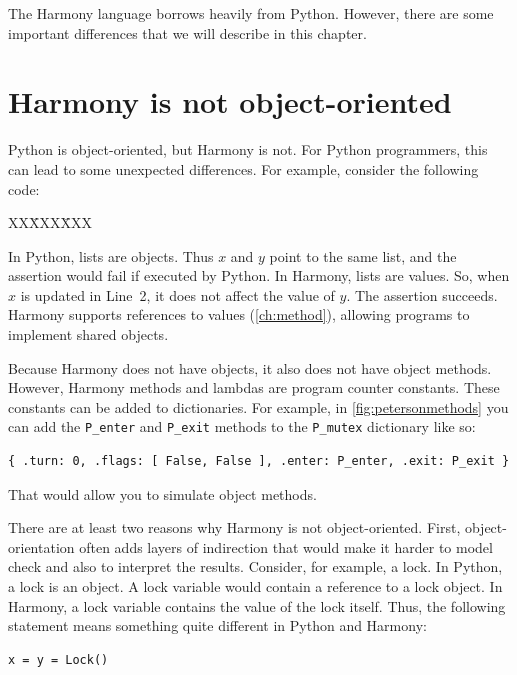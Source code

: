 \documentclass{report}
\newcommand{\harmonysource}[1]{
\begin{tabbing}
XX\=XXX\=XXX\kill
    
\end{tabbing}
}
\newenvironment{code}{
\tcolorbox
}{
\endtcolorbox
}
\begin{document}
The Harmony language borrows heavily from Python.  However, there are
some important differences that we will describe in this chapter.

\section{Harmony is not object-oriented}

Python is object-oriented, but Harmony is not.  For Python programmers,
this can lead to some unexpected differences.
For example, consider the following code:

\begin{code}
\harmonysource{oo}
\end{code}

In Python, lists are objects.  Thus $x$ and $y$ point to the same list,
and the assertion would fail if executed by Python.
In Harmony, lists are values.  So, when $x$ is updated in Line~2, it does
not affect the value of $y$.  The assertion succeeds.
Harmony supports references to values (\autoref{ch:method}),
allowing programs to implement shared objects.

Because Harmony does not have objects, it also does not have object methods.
However, Harmony methods and lambdas are program counter constants.
These constants can be added to dictionaries.
For example, in \autoref{fig:petersonmethods}
you can add the \texttt{P\_enter} and
\texttt{P\_exit} methods to the \texttt{P\_mutex} dictionary
like so:
\begin{code}
\begin{verbatim}
{ .turn: 0, .flags: [ False, False ], .enter: P_enter, .exit: P_exit }
\end{verbatim}
\end{code}
That would allow you to simulate object methods.

There are at least two reasons why Harmony is not object-oriented.
First,
object-orientation often adds layers of indirection that would make it
harder to model check and also to interpret the results.  Consider, for example,
a lock.  In Python, a lock is an object.  A lock variable would contain a
reference to a lock object.  In Harmony, a lock variable contains the value
of the lock itself.
Thus, the following statement means something quite different in Python and
Harmony:

\begin{code}
\begin{verbatim}
x = y = Lock()
\end{verbatim}
\end{code}
\end{document}
